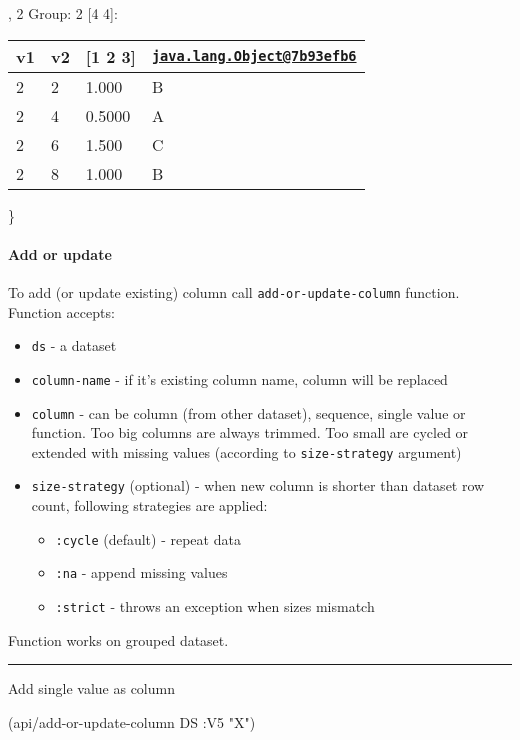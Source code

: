 \documentclass[]{article}
\newenvironment{Shaded}{\begin{snugshade}}{\end{snugshade}}
\newcommand{\StringTok}[1]{\textcolor[rgb]{0.31,0.60,0.02}{#1}}
\newcommand{\AttributeTok}[1]{\textcolor[rgb]{0.77,0.63,0.00}{#1}}
\newcommand{\NormalTok}[1]{#1}
\providecommand{\tightlist}{%
  \setlength{\itemsep}{0pt}\setlength{\parskip}{0pt}}
\let\oldparagraph\paragraph
\renewcommand{\paragraph}[1]{\oldparagraph{#1}\mbox{}}
\begin{document}
, 2 Group: 2 {[}4 4{]}:

\begin{longtable}[]{@{}llll@{}}
\toprule
v1 & v2 & {[}1 2 3{]} &
\href{mailto:java.lang.Object@7b93efb6}{\nolinkurl{java.lang.Object@7b93efb6}}\tabularnewline
\midrule
\endhead
2 & 2 & 1.000 & B\tabularnewline
2 & 4 & 0.5000 & A\tabularnewline
2 & 6 & 1.500 & C\tabularnewline
2 & 8 & 1.000 & B\tabularnewline
\bottomrule
\end{longtable}

\}

\paragraph{Add or update}\label{add-or-update}

To add (or update existing) column call \texttt{add-or-update-column}
function. Function accepts:

\begin{itemize}
\tightlist
\item
  \texttt{ds} - a dataset
\item
  \texttt{column-name} - if it's existing column name, column will be
  replaced
\item
  \texttt{column} - can be column (from other dataset), sequence, single
  value or function. Too big columns are always trimmed. Too small are
  cycled or extended with missing values (according to
  \texttt{size-strategy} argument)
\item
  \texttt{size-strategy} (optional) - when new column is shorter than
  dataset row count, following strategies are applied:

  \begin{itemize}
  \tightlist
  \item
    \texttt{:cycle} (default) - repeat data
  \item
    \texttt{:na} - append missing values
  \item
    \texttt{:strict} - throws an exception when sizes mismatch
  \end{itemize}
\end{itemize}

Function works on grouped dataset.

\begin{center}\rule{0.5\linewidth}{0.5pt}\end{center}

Add single value as column

\begin{Shaded}
\begin{Highlighting}[]
\NormalTok{(api/add-or-update-column DS }\AttributeTok{:V5} \StringTok{"X"}\NormalTok{)}
\end{Highlighting}
\end{Shaded}
\end{document}
